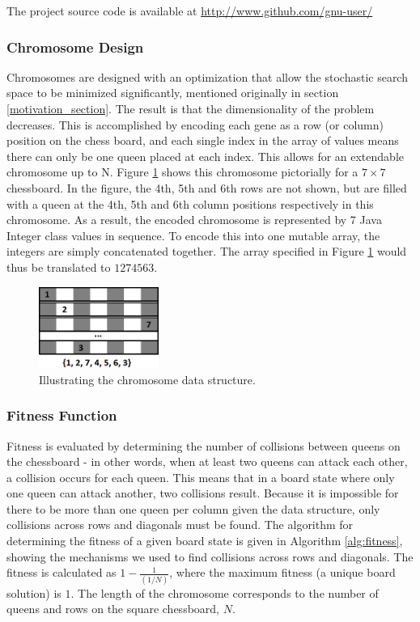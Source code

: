 \documentclass{sig-alternate}
\begin{document}
The project source code is available at \url{http://www.github.com/gnu-user/}

\newpage
\subsubsection{Chromosome Design}

Chromosomes are designed with an optimization that allow the stochastic search space to be minimized significantly, mentioned originally in section \ref{motivation_section}. The result is that the dimensionality of the problem decreases. This is accomplished by encoding each gene as a row (or column) position on the chess board, and each single index in the array of values means there can only be one queen placed at each index. This allows for an extendable chromosome up to N. Figure \ref{fig:chromosome} shows this chromosome pictorially for a $7 \times 7$ chessboard. In the figure, the 4th, 5th and 6th rows are not shown, but are filled with a queen at the 4th, 5th and 6th column positions respectively in this chromosome. As a result, the encoded chromosome is represented by 7 Java Integer class values in sequence. To encode this into one mutable array, the integers are simply concatenated together. The array specified in Figure \ref{fig:chromosome} would thus be translated to $1274563$.

\begin{figure}[h]
\centering
\includegraphics[width=0.35\textwidth]{chromosome.png}
\vspace{-12pt}
\caption{Illustrating the chromosome data structure.}
\label{fig:chromosome}
\end{figure}


\subsubsection{Fitness Function}
Fitness is evaluated by determining the number of collisions between queens on the chessboard - in other words, when at least two queens can attack each other, a collision occurs for each queen. This means that in a board state where only one queen can attack another, two collisions result. Because it is impossible for there to be more than one queen per column given the data structure, only collisions across rows and diagonals must be found. The algorithm for determining the fitness of a given board state is given in Algorithm \ref{alg:fitness}, showing the mechanisms we used to find collisions across rows and diagonals. The fitness is calculated as $1 - \frac{1}{(1/N)}$, where the maximum fitness (a unique board solution) is $1$. The length of the chromosome corresponds to the number of queens and rows on the square chessboard, $N$.
 
\end{document}

